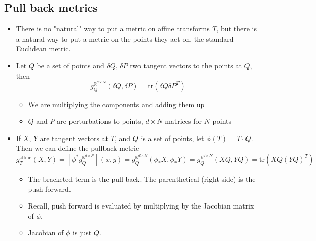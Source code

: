 \documentclass[10pt]{article}
\newcommand{\R}{\mathbb{R}}
\begin{document}
\subsection*{Pull back metrics}
\begin{itemize}
	\item There is no "natural" way to put a metric on affine transforms $T$, but there is a natural way to put a metric on the points they act on, the standard Euclidean metric.
	\item Let $Q$ be a set of points and $\delta Q$, $\delta P$ two tangent vectors to the points at $Q$, then
	\[g_Q^{\R^{d \times N}} (\delta Q, \delta P) = \text{tr} (\delta Q \delta P^T)\]
    \begin{itemize}
        \item We are multiplying the components and adding them up
        \item $Q$ and $P$ are perturbations to points, $d \times N$ matrices for $N$ points
    \end{itemize}
    \item If $X$, $Y$ are tangent vectors at $T$, and $Q$ is a set of points, let $\phi(T) = T \cdot Q$.  Then we can define the pullback metric
    \[g_T^{\text{affine}}(X, Y) = [\phi^* g_Q^{\R^{d \times N}}](x, y) = g_Q^{\R^{d \times N}} (\phi_* X, \phi_* Y) = g_Q^{\R^{d \times N}} (XQ, YQ) = \text{tr}(XQ(YQ)^T)\]
    \begin{itemize}
        \item The bracketed term is the pull back.  The parenthetical (right side) is the push forward.
        \item Recall, push forward is evaluated by multiplying by the Jacobian matrix of $\phi$.
        \item Jacobian of $\phi$ is just $Q$.
    \end{itemize}
\end{itemize}
\end{document}
